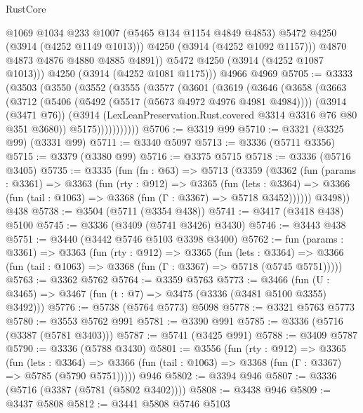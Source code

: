 \begin{lexlean}{RustCore}
\begin{coremodule}
                @1069
                @1034
                @233
                @1007
                (@5465 @134 @1154 @4849 @4853)
                @5472
                @4250
                (@3914 (@4252 @1149 @1013)))
              @4250
              (@3914 (@4252 @1092 @1157)))
            @4870
            @4873
            @4876
            @4880
            @4885
            @4891))
        @5472
        @4250
        (@3914 (@4252 @1087 @1013)))
      @4250
      (@3914 (@4252 @1081 @1175)))
    @4966
    @4969
@5705 := @3333
    (@3503
      (@3550
        (@3552
          (@3555
            (@3577
              (@3601
                (@3619
                  (@3646
                    (@3658
                      (@3663
                        (@3712
                          (@5406 (@5492 (@5517 (@5673 @4972 @4976 @4981 @4984))))
                          (@3914 (@3471 @76))
                          (@3914 (LexLeanPreservation.Rust.covered @3314 @3316 @76 @80 @351 @3680))
                          @5175)))))))))))
@5706 := @3319 @99
@5710 := @3321 (@3325 @99) (@3331 @99)
@5711 := @3340 @5097
@5713 := @3336 (@5711 @3356)
@5715 := @3379 (@3380 @99)
@5716 := @3375 @5715
@5718 := @3336 (@5716 @3405)
@5735 := @3335
    (fun (fn : @63) =>
    @5713
      (@3359
        (@3362
          (fun (params : @3361) =>
          @3363
            (fun (rty : @912) =>
            @3365
              (fun (lets : @3364) =>
              @3366 (fun (tail : @1063) => @3368 (fun (Γ : @3367) => @5718 @3452))))))
        @3498))
    @438
@5738 := @3504 (@5711 (@3354 @438))
@5741 := @3417 (@3418 @438) @5100
@5745 := @3336 (@3409 (@5741 @3426) @3430)
@5746 := @3443 @438
@5751 := @3440 (@3442 @5746 @5103 @3398 @3400)
@5762 := fun (params : @3361) =>
  @3363
    (fun (rty : @912) =>
    @3365
      (fun (lets : @3364) =>
      @3366 (fun (tail : @1063) => @3368 (fun (Γ : @3367) => @5718 (@5745 @5751)))))
@5763 := @3362 @5762
@5764 := @3359 @5763
@5773 := @3466 (fun (U : @3465) => @3467 (fun (t : @7) => @3475 (@3336 (@3481 @5100 @3355) @3492)))
@5776 := @5738 (@5764 @5773) @5098
@5778 := @3321 @5763 @5773
@5780 := @3553 @5762 @991
@5781 := @3390 @991
@5785 := @3336 (@5716 (@3387 (@5781 @3403)))
@5787 := @5741 (@3425 @991)
@5788 := @3409 @5787
@5790 := @3336 (@5788 @3430)
@5801 := @3556
    (fun (rty : @912) =>
    @3365
      (fun (lets : @3364) =>
      @3366 (fun (tail : @1063) => @3368 (fun (Γ : @3367) => @5785 (@5790 @5751)))))
    @946
@5802 := @3394 @946
@5807 := @3336 (@5716 (@3387 (@5781 (@5802 @3402))))
@5808 := @3438 @946
@5809 := @3437 @5808
@5812 := @3441 @5808 @5746 @5103

\end{coremodule}
\end{lexlean}
